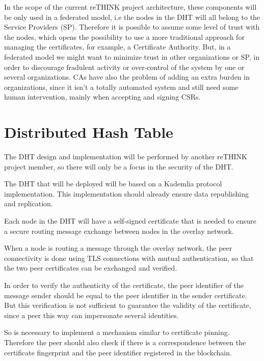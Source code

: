 In the scope of the current reTHINK project architecture, these components will be only used in a federated model, i.e the nodes in the \ac{DHT} will all belong to the Service Providers (SP).
Therefore it is possible to assume some level of trust with the nodes, which opens the possibility to use a more traditional approach for managing the certificates, for example, a Certificate Authority.
But, in a federated model we might want to minimize trust in other organizations or SP, in order to discourage fradulent activity or over-control of the system by one or several organizations.
\acp{CA} have also the problem of adding an extra burden in organizations, since it isn't a totally automated system and still need some human intervention, mainly when accepting and signing \acp{CSR}.

\section{Distributed Hash Table}\label{ssec:dht}

The DHT design and implementation will be performed by another reTHINK project member, so there will only be a focus in the security of the DHT.

The DHT that will be deployed will be based on a Kademlia protocol implementation.
This implementation should already ensure data republishing and replication.

Each node in the DHT will have a self-signed certificate that is needed to ensure a secure routing message exchange between nodes in the overlay network.

When a node is routing a message through the overlay network, the peer connectivity is done using TLS connections with mutual authentication, so that the two peer certificates can be exchanged and verified.

In order to verify the authenticity of the certificate, the peer identifier of the message sender should be equal to the peer identifier in the sender certificate.
But this verification is not sufficient to guarantee the validity of the certificate, since a peer this way can impersonate several identities.

So is necessary to implement a mechanism similar to certificate pinning.
Therefore the peer should also check if there is a correspondence between the certificate fingerprint and the peer identifier registered in the blockchain.


